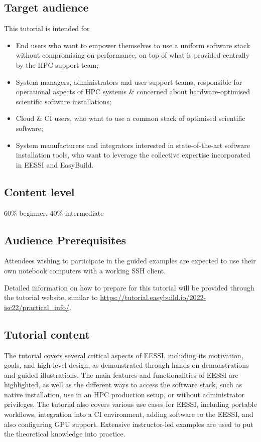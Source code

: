 \subsection*{Target audience}
This tutorial is intended for
\begin{itemize}
    \item End users who want to empower themselves to use a uniform software stack without compromising on
          performance, on top of what is provided centrally by the HPC support team;
    \item System managers, administrators and user support teams, responsible for operational aspects of HPC systems \&
          concerned about hardware-optimised scientific software installations;
    \item Cloud \& CI users, who want to use a common stack of optimised scientific software;
    \item System manufacturers and integrators interested in state-of-the-art software installation tools, who want to
          leverage the collective expertise incorporated in EESSI and EasyBuild.
\end{itemize}

\subsection*{Content level}
60\% beginner, 40\% intermediate

\subsection*{Audience Prerequisites}
Attendees wishing to participate in the guided examples are expected to use their
own notebook computers with a working SSH client.

Detailed information on how to prepare for this tutorial will be provided
through the tutorial website, similar to
\url{https://tutorial.easybuild.io/2022-isc22/practical_info/}.

\subsection*{Tutorial content}
The tutorial covers several critical aspects of EESSI, including its motivation, goals, and high-level design, as
demonstrated through hands-on demonstrations and guided illustrations. The main features and functionalities of EESSI
are highlighted, as well as the different ways to access the software stack, such as native installation, use in an HPC
production setup, or without administrator privileges. The tutorial also covers various use cases for EESSI, including
portable workflows, integration into a CI environment, adding software to the EESSI, and also configuring GPU support.
Extensive instructor-led examples are used to put the theoretical knowledge into practice.

